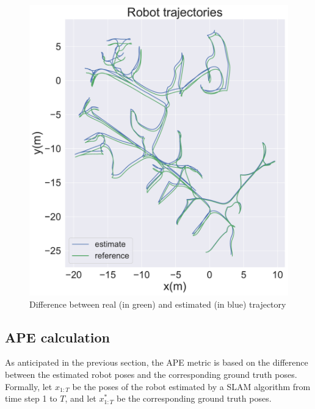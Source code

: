 \documentclass[a4paper]{article}
\begin{document}
\begin{figure}[htbp]
\begin{minipage}{0.48\textwidth}
        \includegraphics[width=\linewidth]{figures/trajectories.pdf}
        \caption{Difference between real (in green) and estimated (in blue) trajectory}
        \label{fig:trajectories}
    \end{minipage}
\end{figure}

\subsection{APE calculation}
As anticipated in the previous section, the APE metric is based on the difference between the estimated robot 
poses and the corresponding ground truth poses. Formally, let $x_{1:T}$ be the poses of the robot estimated by
a SLAM algorithm from time step 1 to $T$, and let $x^*_{1:T}$ be the corresponding ground truth poses. 

\clearpage
\printbibliography
\end{document}
